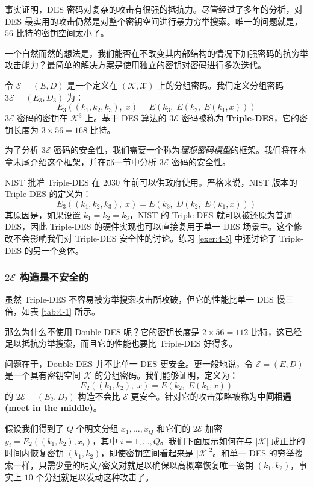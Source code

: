 事实证明，DES 密码对复杂的攻击有很强的抵抗力。尽管经过了多年的分析，对 DES 最实用的攻击仍然是对整个密钥空间进行暴力穷举搜索。唯一的问题就是，$56$ 比特的密钥空间太小了。

一个自然而然的想法是，我们能否在不改变其内部结构的情况下加强密码的抗穷举攻击能力？最简单的解决方案是使用独立的密钥对密码进行多次迭代。

令 $\mathcal{E}=(E,D)$ 是一个定义在 $(\mathcal{K},\mathcal{X})$ 上的分组密码。我们定义分组密码 $3\mathcal{E}=(E_3,D_3)$ 为：
\[
E_3((k_1,k_2,k_3),\;x)=E(k_3,\;E(k_2,\;E(k_1,x)))
\]
$3\mathcal{E}$ 密码的密钥在 $\mathcal{K}^3$ 上。基于 DES 算法的 $3\mathcal{E}$ 密码被称为 \textbf{Triple-DES}，它的密钥长度为 $3\times56=168$ 比特。

\begin{snote}[安全性。]
为了分析 $3\mathcal{E}$ 密码的安全性，我们需要一个称为\emph{理想密码模型}的框架。我们将在本章末尾介绍这个框架，并在那一节中分析 $3\mathcal{E}$ 密码的安全性。
\end{snote}

\begin{snote}
NIST 批准 Triple-DES 在 2030 年前可以供政府使用。严格来说，NIST 版本的 Triple-DES 的定义为：
\[
E_3((k_1,k_2,k_3),\;x)=E(k_3,\;D(k_2,\;E(k_1,x)))
\]
其原因是，如果设置 $k_1=k_2=k_3$，NIST 的 Triple-DES 就可以被还原为普通 DES，因此 Triple-DES 的硬件实现也可以直接复用于单一 DES 场景中。这个修改不会影响我们对 Triple-DES 安全性的讨论。练习 \ref{exer:4-5} 中还讨论了 Triple-DES 的另一个变体。
\end{snote}

\subsubsection{$2\mathcal{E}$ 构造是不安全的}

虽然 Triple-DES 不容易被穷举搜索攻击所攻破，但它的性能比单一 DES 慢三倍，如表 \ref{tab:4-1} 所示。

那么为什么不使用 Double-DES 呢？它的密钥长度是 $2\times56=112$ 比特，这已经足以抵抗穷举搜索，而且它的性能也要比 Triple-DES 好得多。

问题在于，Double-DES 并不比单一 DES 更安全。更一般地说，令 $\mathcal{E}=(E,D)$ 是一个具有密钥空间 $\mathcal{K}$ 的分组密码。我们能够证明，定义为：
\[
E_2((k_1,k_2),\;x)=E(k_2,\;E(k_1,x))
\]
的 $2\mathcal{E}=(E_2,D_2)$ 构造不会比 $\mathcal{E}$ 更安全。针对它的攻击策略被称为\textbf{中间相遇 (meet in the middle)}。

假设我们得到了 $Q$ 个明文分组 $x_1,\dots,x_Q$ 和它们的 $2\mathcal{E}$ 加密 $y_i=E_2((k_1,k_2),x_i)$，其中 $i=1,\dots,Q$。我们下面展示如何在与 $|\mathcal{K}|$ 成正比的时间内恢复密钥 $(k_1,k_2)$，即使密钥空间看起来是 $|\mathcal{K}|^2$。和单一 DES 的穷举搜索一样，只需少量的明文/密文对就足以确保以高概率恢复唯一密钥 $(k_1,k_2)$，事实上 $10$ 个分组就足以发动这种攻击了。

